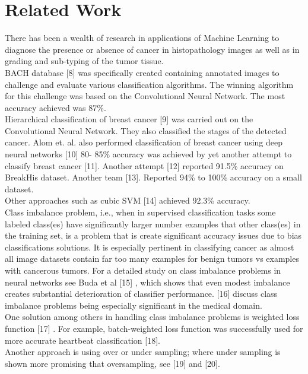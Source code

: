 \documentclass[conference]{IEEEtran}
\begin{document}
\section{Related Work}
There has been a wealth of research in applications of Machine Learning to
diagnose the presence or absence of cancer in histopathology images as well as
in grading and sub-typing of the tumor tissue.
\\ \indent BACH database [8] was specifically created containing annotated
images to challenge and evaluate various classification algorithms. The winning
algorithm for this challenge was based on the Convolutional Neural Network. The
most accuracy achieved was 87\%.
\\ \indent Hierarchical classification of breast cancer [9] was carried out on
the Convolutional Neural Network. They also classified the stages of the
detected cancer. Alom et. al. also performed classification of breast cancer
using deep neural networks [10]  80- 85\% accuracy was achieved by yet another
attempt to classify breast cancer [11]. Another attempt [12] reported 91.5\%
accuracy on BreakHis dataset. Another team [13]. Reported 94\% to 100\% accuracy
on a small dataset.
\\ \indent Other approaches such as cubic SVM [14] achieved 92.3\% accuracy.
\\ \indent Class imbalance problem, i.e., when in supervised classification
tasks some labeled class(es) have significantly larger number examples that
other class(es) in the training set, is a problem that is create significant
accuracy issues due to bias classifications solutions. It is especially
pertinent in classifying cancer as almost all image datasets contain far too
many examples for benign tumors vs examples with cancerous tumors.  For a
detailed study on class imbalance problems in neural networks see Buda et al
[15] , which shows that even modest imbalance creates substantial deterioration
of classifier performance. [16] discuss class imbalance problems being
especially significant in the medical domain.
\\ \indent One solution among others in handling class imbalance problems is
weighted loss function [17] . For example, batch-weighted loss function was
successfully used for more accurate heartbeat classification [18].
\\ \indent Another approach is using over or under sampling; where under
sampling is shown more promising that oversampling, see [19]  and  [20].
\end{document}
